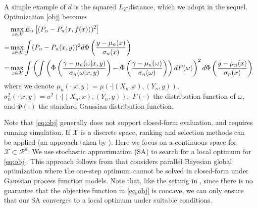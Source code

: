 \documentclass{wscpaperproc}
\theoremstyle{wsc}
\begin{document}
A simple example of $d$ is the squared $L_2$-distance, which we adopt in the sequel. Optimization \eqref{obj} becomes
\begin{align}
&\max_{x \in \mathcal{X}} E_n \left[ (P_n-P_n(x,f(x)))^2  \right]\notag\\
=& \max_{x \in \mathcal{X}} \int (P_n-P_n(x,y))^2 d \Phi\left(\frac{y-\mu_n(x)}{\sigma_n(x)}\right)\notag\\
=& \max_{x \in \mathcal{X}} \int \left(\int \left(\Phi\left(\frac{\gamma-\mu_n(\omega|x,y)}{\sigma_n(\omega|x,y)}\right) -\Phi\left(\frac{\gamma-\mu_{n}(\omega)}{\sigma_{n}(\omega)}\right)\right) dF(\omega)\right)^2 d \Phi\left(\frac{y-\mu_n(x)}{\sigma_n(x)}\right)
\label{eq:obj}
\end{align}
where we denote $\mu_n(\cdot|x,y)=\mu(\cdot|(X_n,x),(Y_n,y))$, $\sigma_n^2(\cdot|x,y)=\sigma^2(\cdot|(X_n,x),(Y_n,y)), $ $F(\cdot)$ the distribution function of $\omega$, and $\Phi(\cdot)$ the standard Gaussian distribution function. 

Note that \eqref{eq:obj} generally does not support closed-form evaluation, and requires running simulation. If $\mathcal X$ is a discrete space, ranking and selection methods can be applied (an approach taken by ). Here we focus on a continuous space for $\mathcal X\subset\mathcal R^d$. We use stochastic approximation (SA) \cite{kushner2003stochastic} to search for a local optimum for \eqref{eq:obj}. This approach follows from  that considers parallel Bayesian global optimization where the one-step optimum cannot be solved in closed-form under Gaussian process function models. Note that, like the setting in , since there is no guarantee that the objective function in \eqref{eq:obj} is concave, we can only ensure that our SA converges to a local optimum under suitable conditions.

\end{document}
